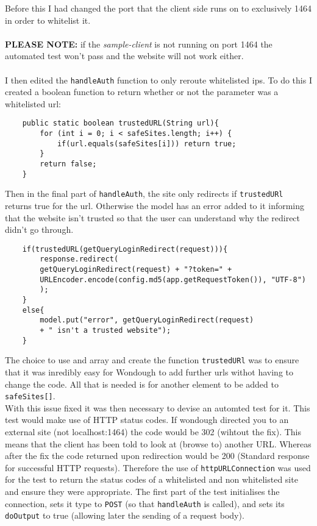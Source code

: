 Before this I had changed the port that the client side runs on to exclusively 1464 in order to whitelist it.\\ \\
\textbf{PLEASE NOTE:} if the \textit{sample-client} is not running on port 1464 the automated test won't pass and the website will not work either.\\ \\
I then edited the \verb|handleAuth| function to only reroute whitelisted ips. To do this I created a boolean function to return whether or not the parameter was a whitelisted url:
\begin{verbatim}
    public static boolean trustedURL(String url){
        for (int i = 0; i < safeSites.length; i++) {
            if(url.equals(safeSites[i])) return true;
        }
        return false;
    }
\end{verbatim}
Then in the final part of \verb|handleAuth|, the site only redirects if \verb|trustedURl| returns true for the url. Otherwise the model has an error added to it informing that the
website isn't trusted so that the user can understand why the redirect didn't go through.
\begin{verbatim}
    if(trustedURL(getQueryLoginRedirect(request))){
        response.redirect(
        getQueryLoginRedirect(request) + "?token=" +
        URLEncoder.encode(config.md5(app.getRequestToken()), "UTF-8")
        );
    }
    else{
        model.put("error", getQueryLoginRedirect(request)
        + " isn't a trusted website");
    }
\end{verbatim}
The choice to use and array and create the function \verb|trustedURl| was to ensure that it was inredibly easy for Wondough to add further urls withot having to change the code. All
that is needed is for another element to be added to \verb|safeSites[]|.\\
With this issue fixed it was then necessary to devise an automted test for it. This test would make use of HTTP status codes. If wondough directed you to an external site (not localhost:1464)
the code would be 302 (wihtout the fix). This means that the client has been told to look at (browse to) another URL. Whereas after the fix the code returned upon redirection would
be 200 (Standard response for successful HTTP requests)\cite{http}. Therefore the use of \verb|httpURLConnection| was used for the test to return the status codes of a whitelisted and
non whitelisted site and ensure they were appropriate. The first part of the test initialises the connection, sets it type to \verb|POST| (so that \verb|handleAuth| is called), and sets its \verb|doOutput| to true (allowing later the sending of a request body).
